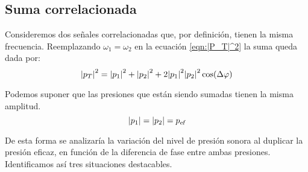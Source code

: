\documentclass[a5paper,12pt,twoside]{book}
\begin{document}
\subsection{Suma correlacionada}

Consideremos dos señales correlacionadas que, por definición, tienen la misma frecuencia.
Reemplazando $\omega_1=\omega_2$ en la ecuación \ref{eqn:|P_T|^2} la suma queda dada por:
\begin{equation*}
    {\left| {p_T} \right|}^2 = {\left| {p_1} \right|}^2 + {\left| {p_2} \right|}^2 + 2 {\left| {p_1} \right|}^2 {\left| {p_2} \right|}^2 \cos(\Delta \varphi)
\end{equation*}

Podemos suponer que las presiones que están siendo sumadas tienen la misma amplitud.
\begin{equation*}
    {\left| {p_1} \right|} = {\left| {p_2} \right|} = {{{p}_\textsl{{ef}}}}
\end{equation*}

De esta forma se analizaría la variación del nivel de presión sonora al duplicar la presión eficaz, en función de la diferencia de fase entre ambas presiones.
Identificamos así tres situaciones destacables.
\end{document}
